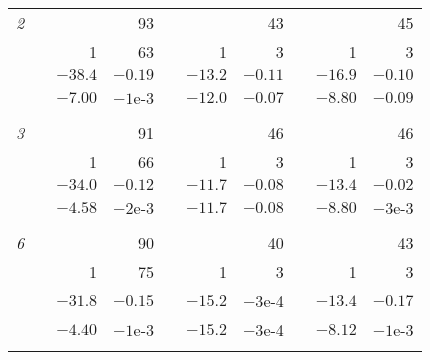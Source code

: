 \documentclass[11pt]{article}
\newcommand{\0}{\phantom{0}}
\begin{document}
\begin{table}[!htbp]
\begin{threeparttable}
\begin{tabular}{lrrrrrrrrr}
			{\it 2}  &  &                           & 93      &                               &         & 43                       &  &          & 45      \\
			         &  & 1                         & 63      &                               & 1       & 3                        &  & 1        & 3       \\
			         &  & $-38.4$                   & $-0.19$ &                               & $-13.2$ & $-0.11$                  &  & $-16.9$  & $-0.10$ \\
			         &  & $-7.00$                   & $-1$e-3 &                               & $-12.0$ & $-0.07$                  &  & $-8.80$  & $-0.09$ \\\\[-0.3cm]

			{\it 3}  &  &                           & 91      &                               &         & 46                       &  &          & 46      \\
			         &  & 1                         & 66      &                               & 1       & 3                        &  & 1        & 3       \\
			         &  & $-34.0$                   & $-0.12$ &                               & $-11.7$ & $-0.08$                  &  & $-13.4$  & $-0.02$ \\
			         &  & $-4.58$                   & $-2$e-3 &                               & $-11.7$ & $-0.08$                  &  & $-8.80$  & $-3$e-3 \\\\[-0.3cm]

			{\it 6}  &  &                           & 90      &                               &         & 40                       &  &          & 43      \\
			         &  & 1                         & 75      &                               & 1       & 3                        &  & 1        & 3       \\
			         &  & $-31.8$                   & $-0.15$ &                               & $-15.2$ & $-3$e-4                  &  & $-13.4$  & $-0.17$ \\
			         &  & $-4.40$                   & $-1$e-3 &                               & $-15.2$ & $-3$e-4                  &  & $-8.12$  & $-1$e-3 \\\\[-0.3cm]


\end{tabular}
\end{threeparttable}
\end{table}
\end{document}
